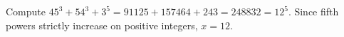 Compute $45^3+54^3+3^5=91125+157464+243=248832=12^5$. Since fifth powers strictly increase on positive integers, $\boxed{x=12}$.
